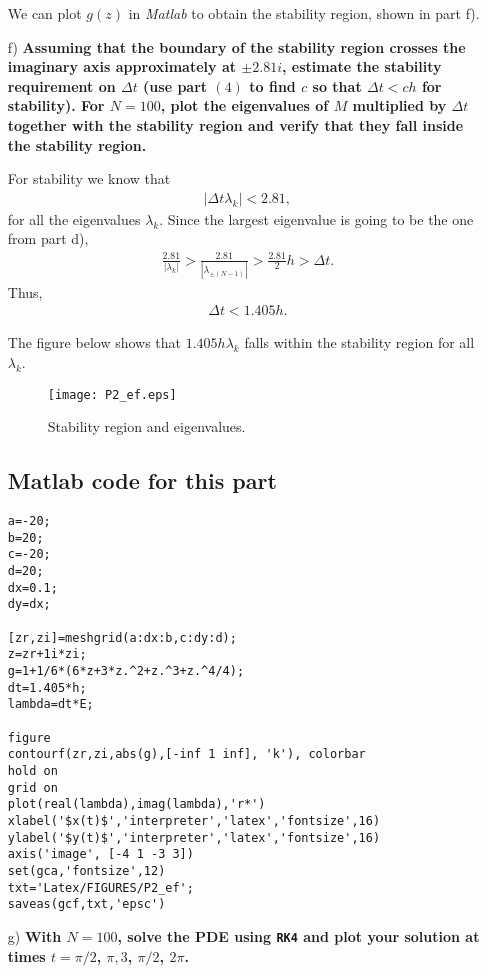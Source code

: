 \begin{enumerate}
We can plot $g(z)$ in \textsl{Matlab} to obtain the stability region, shown in part f).

\item[f)] \textbf{Assuming that the boundary of the stability region crosses the imaginary axis approximately at $\pm 2.81i$, estimate the stability requirement on $\Delta t$ (use part $(4)$ to find $c$ so that $\Delta t < ch$ for stability). For $N = 100$, plot the eigenvalues of $M$ multiplied by $\Delta t$ together with the stability region and verify that they fall inside the stability region.}

For stability we know that
\begin{align*}
\left|\Delta t \lambda_k\right|<2.81,
\end{align*}
for all the eigenvalues $\lambda_k$. Since the largest eigenvalue is going to be the one from part d),
\begin{align*}
\frac{2.81}{|\lambda_k|} > \frac{2.81}{|\lambda_{\pm (N-1)}|} > \frac{2.81}{2}h > \Delta t.
\end{align*}
Thus,
\begin{align*}
\Delta t < 1.405h.
\end{align*}

The figure below shows that $1.405h \lambda_k$ falls within the stability region for all $\lambda_k$.
\begin{figure}[H]
\centering     %
{\texttt{[image: P2\_ef.eps]}}
\caption{Stability region and eigenvalues.}
\end{figure}

\subsection*{Matlab code for this part}
\begin{verbatim}
a=-20;
b=20;
c=-20;
d=20;
dx=0.1;
dy=dx;

[zr,zi]=meshgrid(a:dx:b,c:dy:d);
z=zr+1i*zi;
g=1+1/6*(6*z+3*z.^2+z.^3+z.^4/4);
dt=1.405*h;
lambda=dt*E;

figure
contourf(zr,zi,abs(g),[-inf 1 inf], 'k'), colorbar
hold on
grid on
plot(real(lambda),imag(lambda),'r*')
xlabel('$x(t)$','interpreter','latex','fontsize',16)
ylabel('$y(t)$','interpreter','latex','fontsize',16)
axis('image', [-4 1 -3 3])
set(gca,'fontsize',12)
txt='Latex/FIGURES/P2_ef';
saveas(gcf,txt,'epsc')
\end{verbatim}

\item[g)] \textbf{With $N=100$, solve the PDE using \texttt{RK4} and plot your solution at times $t = \pi/2$, $\pi,3$, $\pi/2$, $2\pi$.}


\end{enumerate}
